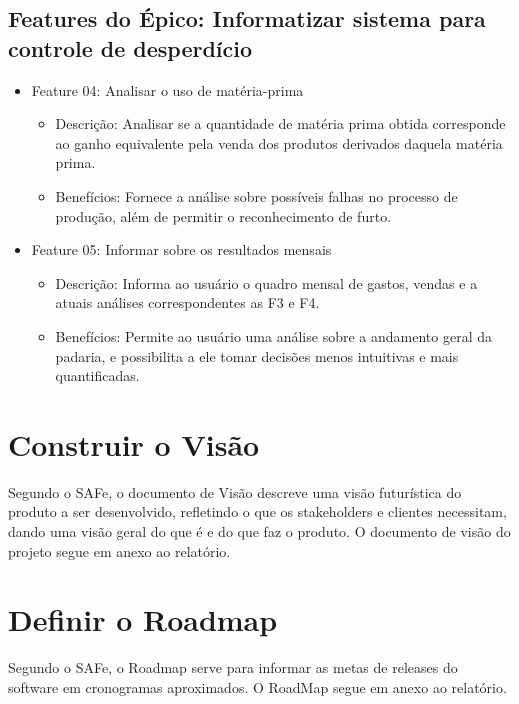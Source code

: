 \subsection{Features do Épico: Informatizar sistema para controle de desperdício}

\begin{itemize}

\item Feature 04: Analisar o uso de matéria-prima
\begin{itemize}
	\item Descrição: Analisar se a quantidade de matéria prima obtida corresponde ao ganho equivalente pela venda
	dos produtos derivados daquela matéria prima.
	\item Benefícios: Fornece a análise sobre possíveis falhas no processo de produção, além de permitir o reconhecimento de furto.

\end{itemize}

\item Feature 05: Informar sobre os resultados mensais
\begin{itemize}
	\item Descrição: Informa ao usuário o quadro mensal de gastos, vendas e a atuais análises correspondentes as F3 e F4.
	\item Benefícios: Permite ao usuário uma análise sobre a andamento geral da padaria, e possibilita a ele tomar decisões menos
	intuitivas e mais quantificadas.
\end{itemize}

\end{itemize}

\section{Construir o Visão}

Segundo o SAFe, o documento de Visão descreve uma visão futurística do produto a ser desenvolvido, refletindo o que os stakeholders e clientes necessitam, dando uma visão geral do que é e do que faz o produto.
O documento de visão do projeto segue em anexo ao relatório.


\section{Definir o Roadmap}
Segundo o SAFe, o Roadmap serve para informar as metas de releases do software em cronogramas aproximados.
O RoadMap segue em anexo ao relatório.

